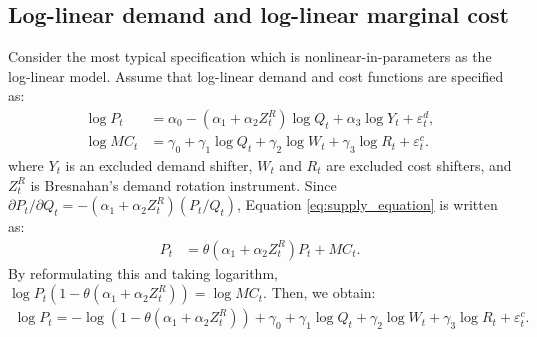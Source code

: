 \documentclass[11pt, a4paper]{article}
\begin{document}
\subsection{Log-linear demand and log-linear marginal cost}
Consider the most typical specification which is nonlinear-in-parameters as the log-linear model.
Assume that log-linear demand and cost functions are specified as:
\begin{align}
    \log P_{t} &= \alpha_0 - (\alpha_1 + \alpha_2 Z^{R}_{t}) \log Q_t + \alpha_3 \log Y_t + \varepsilon^{d}_{t},\label{eq:log_linear_demand}\\
    \log MC_t &= \gamma_0 + \gamma_1 \log Q_t +  \gamma_2 \log W_{t} + \gamma_3 \log R_t + \varepsilon^{c}_{t}.\label{eq:log_linear_marginal_cost}
\end{align}
where $Y_{t}$ is an excluded demand shifter, $W_t$ and $R_t$ are excluded cost shifters, and $Z_t^R$ is Bresnahan's demand rotation instrument.
Since $\partial P_t/\partial Q_t = - (\alpha_1 + \alpha_2 Z_{t}^R) (P_t/Q_t) $, Equation \eqref{eq:supply_equation} is written as:
\begin{align}
    P_t &= \theta (\alpha_1 + \alpha_2 Z^{R}_{t}) P_t + MC_t.\label{eq:log_linear_supply_equation_direct}
\end{align}
By reformulating this and taking logarithm, $\log P_t(1 -\theta (\alpha_1 + \alpha_2 Z^{R}_{t})) = \log MC_t.$
Then, we obtain:
\begin{align}
    \log P_t = - \log(1 - \theta(\alpha_1 + \alpha_2 Z^{R}_{t})) + \gamma_0 + \gamma_1 \log Q_t +  \gamma_2 \log W_{t} + \gamma_3 \log R_t + \varepsilon^{c}_{t}. \label{eq:log_linear_supply_equation}
\end{align}

\end{document}

